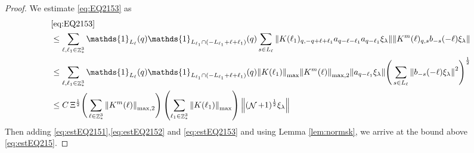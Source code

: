 \documentclass[12pt,a4paper]{article}
\numberwithin{equation}{section}
\newcommand{\1}{\mathbb{I}}
\DeclareMathOperator{\Z}{\mathbb{Z}}
\DeclareMathOperator{\NN}{\mathcal{N}}
\newcommand{\half}{\frac{1}{2}}
\theoremstyle{plain}
\theoremstyle{definition}
\theoremstyle{remark}
\theoremstyle{plain}
\theoremstyle{definition}
\theoremstyle{remark}
\begin{document}
\begin{proof}
We estimate \eqref{eq:EQ2153} as 
\begin{align}
	&\eqref{eq:EQ2153}\nonumber\\
	&\leq  \sum\limits_{\ell, \ell_1\in \Z^3_*} \mathds{1}_{L_{\ell}}(q) \mathds{1}_{L_{\ell_1}\cap (-L_{\ell_1}+\ell+\ell_1)}(q) \sum\limits_{ s \in L_{\ell}} \norm{K(\ell_1)_{q,-q+\ell+\ell_1} a_{q-\ell-\ell_1}  a_{q-\ell_1} \xi_\lambda} \norm{ K^m(\ell)_{q,s}  b_{-s}(-\ell) \xi_\lambda }\nonumber\\
	&\leq  \sum\limits_{\ell, \ell_1\in \Z^3_*} \mathds{1}_{L_{\ell}}(q) \mathds{1}_{L_{\ell_1}\cap (-L_{\ell_1}+\ell+\ell_1)}(q) \norm{K(\ell_1)}_{\max} \norm{K^m(\ell)}_{\mathrm{max,2}} \norm{  a_{q-\ell_1} \xi_\lambda} \Bigg( \sum\limits_{ s \in L_{\ell}} \norm{ b_{-s}(-\ell) \xi_\lambda }^2\Bigg)^\half\nonumber\\
	&\leq  C\, \Xi^\half \Bigg(\sum\limits_{\ell \in \Z^3_*}\norm{K^m(\ell)}_{\mathrm{max,2}}\Bigg) \left( \sum\limits_{\ell_1\in \Z^3_*} \norm{ K(\ell_1)}_{\max} \right) \norm{(\NN+1)^\half\xi_\lambda}\label{eq:estEQ2153}
\end{align}
Then adding \eqref{eq:estEQ2151},\eqref{eq:estEQ2152} and \eqref{eq:estEQ2153} and using Lemma \ref{lem:normsk}, we arrive at the bound above \eqref{eq:estEQ215}.
\end{proof}
\end{document}
